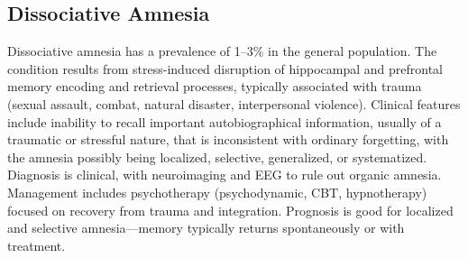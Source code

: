 






\label{sec:Dissociative Disorders}

\subsection{Dissociative Amnesia}
\label{sec:Dissociative Amnesia}
Dissociative amnesia has a prevalence of 1--3\% in the general population. The condition results from stress-induced disruption of hippocampal and prefrontal memory encoding and retrieval processes, typically associated with trauma (sexual assault, combat, natural disaster, interpersonal violence). Clinical features include inability to recall important autobiographical information, usually of a traumatic or stressful nature, that is inconsistent with ordinary forgetting, with the amnesia possibly being localized, selective, generalized, or systematized. Diagnosis is clinical, with neuroimaging and EEG to rule out organic amnesia. Management includes psychotherapy (psychodynamic, CBT, hypnotherapy) focused on recovery from trauma and integration. Prognosis is good for localized and selective amnesia---memory typically returns spontaneously or with treatment.


